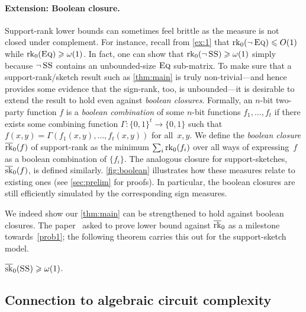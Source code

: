 \documentclass{article}
\begin{document}
\paragraph{Extension: Boolean closure.}
Support-rank lower bounds can sometimes feel brittle as the measure is not closed under complement. For instance, recall from \ref{ex:1} that $\operatorname{rk}_0(\neg\operatorname{\textsc{Eq}})\leqslant O(1)$ while $\operatorname{rk}_0(\operatorname{\textsc{Eq}})\geqslant\omega(1)$. In fact, one can show that $\operatorname{rk}_0(\neg\operatorname{\textsc{SS}})\geqslant \omega(1)$ simply because $\neg\operatorname{\textsc{SS}}$ contains an unbounded-size $\operatorname{\textsc{Eq}}$ sub-matrix. To make sure that a support-rank/sketch result such as \cref{thm:main} is truly non-trivial---and hence provides some evidence that the sign-rank, too, is unbounded---it is desirable to extend the result to hold even against \emph{boolean closures}. Formally, an $n$-bit two-party function $f$ is a \emph{boolean combination} of some $n$-bit functions $f_1,\ldots,f_t$ if there exists some combining function $\Gamma\colon\{0,1\}^t\to\{0,1\}$ such that $f(x,y)=\Gamma(f_1(x,y),\ldots,f_t(x,y))$ for all~$x,y$. We define the \emph{boolean closure} $\operatorname{\overline{rk}}_0(f)$  of support-rank as the minimum $\sum_i \operatorname{rk}_0(f_i)$ over all ways of expressing~$f$ as a boolean combination of $\{f_i\}$. The analogous closure for support-sketches, $\operatorname{\overline{sk}}_0(f)$, is defined similarly. \cref{fig:boolean} illustrates how these measures relate to existing ones (see \cref{sec:prelim} for proofs). In particular, the boolean closures are still efficiently simulated by the corresponding sign measures.

We indeed show our \cref{thm:main} can be strengthened to hold against boolean closures. The paper~\cite{GHIS25} asked to prove lower bound against $\operatorname{\overline{rk}}_0$ as a milestone towards~\cref{prob1}; the following theorem carries this out for the support-sketch model.

\begin{boxtheorem} \label{thm:main-ext}
    $\operatorname{\overline{sk}}_0(\operatorname{\textsc{SS}})\geqslant \omega(1)$.
\end{boxtheorem}



\subsection{Connection to algebraic circuit complexity}
 
\end{document}
